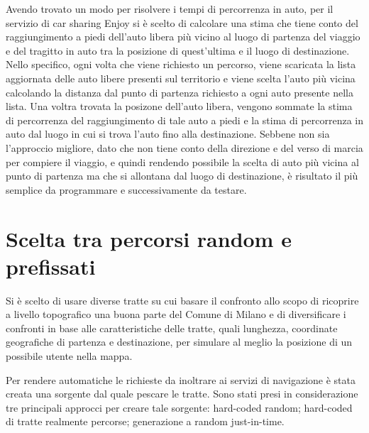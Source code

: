 Avendo trovato un modo per risolvere i tempi di percorrenza in auto, per il servizio di car sharing Enjoy si è scelto di calcolare una stima che tiene conto del raggiungimento a piedi dell'auto libera più vicino al luogo di partenza del viaggio e del tragitto in auto tra la posizione di quest'ultima e il luogo di destinazione. Nello specifico, ogni volta che viene richiesto un percorso, viene scaricata la lista aggiornata delle auto libere presenti sul territorio e viene scelta l'auto più vicina calcolando la distanza dal punto di partenza richiesto a ogni auto presente nella lista. Una voltra trovata la posizone dell'auto libera, vengono sommate la stima di percorrenza del raggiungimento di tale auto a piedi e la stima di percorrenza in auto dal luogo in cui si trova l'auto fino alla destinazione. Sebbene non sia l'approccio migliore, dato che non tiene conto della direzione e del verso di marcia per compiere il viaggio, e quindi rendendo possibile la scelta di auto più vicina al punto di partenza ma che si allontana dal luogo di destinazione, è risultato il più semplice da programmare e successivamente da testare.

\section{Scelta tra percorsi random e prefissati}

Si è scelto di usare diverse tratte su cui basare il confronto allo scopo di ricoprire a livello topografico una buona parte del Comune di Milano e di diversificare i confronti in base alle caratteristiche delle tratte, quali lunghezza, coordinate geografiche di partenza e destinazione, per simulare al meglio la posizione di un possibile utente nella mappa.

Per rendere automatiche le richieste da inoltrare ai servizi di navigazione è stata creata una sorgente dal quale pescare le tratte. Sono stati presi in considerazione tre principali approcci per creare tale sorgente: hard-coded random; hard-coded di tratte realmente percorse; generazione a random just-in-time.

